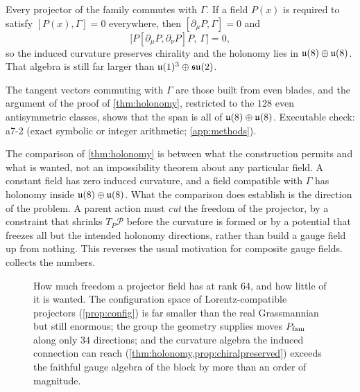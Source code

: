 \begin{proposition}
\label{prop:chiralpreserved}
Every projector of the family commutes with $\Gamma$. If a field $P(x)$ is required to satisfy $[P(x),\Gamma]=0$ everywhere, then
$[\partial_\mu P,\Gamma]=0$ and
\[
\bigl[P[\partial_\mu P,\partial_\nu P]P,\ \Gamma\bigr]=0 ,
\]
so the induced curvature preserves chirality and the holonomy lies in $\mathfrak{u}(8)\oplus\mathfrak{u}(8)$. That algebra is still far larger than
$\mathfrak{u}(1)^3\oplus\mathfrak{su}(2)$.
\end{proposition}

\noindent The tangent vectors commuting with $\Gamma$ are those built from even blades, and the argument of the proof of \cref{thm:holonomy}, restricted to
the $128$ even antisymmetric classes, shows that the span is all of $\mathfrak{u}(8)\oplus\mathfrak{u}(8)$. Executable check: a7-2 (exact symbolic or integer arithmetic;
\cref{app:methods}).

The comparison of \cref{thm:holonomy} is between what the construction permits and what is wanted, not an impossibility theorem
about any particular field. A constant field has zero induced curvature, and a field compatible with $\Gamma$ has holonomy inside
$\mathfrak{u}(8)\oplus\mathfrak{u}(8)$. What the comparison does establish is the direction of the problem. A parent action must \emph{cut} the freedom of
the projector, by a constraint that shrinks $T_P\mathcal P$ before the curvature is formed or by a potential that freezes all but the
intended holonomy directions, rather than build a gauge field up from nothing. This reverses the usual motivation for composite
gauge fields.  collects the numbers.

\begin{figure}[t]
\centering
{}
\caption{How much freedom a projector field has at rank $64$, and how little of it is wanted. The configuration space of
Lorentz-compatible projectors (\cref{prop:config}) is far smaller than the real Grassmannian but still enormous; the group the
geometry supplies moves $P_{\rm fam}$ along only $34$ directions; and the curvature algebra the induced connection can reach
(\cref{thm:holonomy,prop:chiralpreserved}) exceeds the faithful gauge algebra of the block by more than an order of magnitude.}
\label{fig:freedom}
\end{figure}

